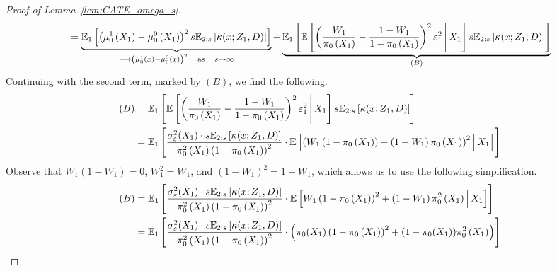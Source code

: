\begin{proof}[Proof of Lemma~\ref{lem:CATE_omega_s}]
\begin{equation}
\begin{aligned}
			 & \quad = \underbrace{\mathbb{E}_{1}\left[\left(\mu_{0}^{1}\left(X_{1}\right) - \mu_{0}^{0}\left(X_{1}\right)\right)^2 s \mathbb{E}_{2:s}\left[\kappa(x; Z_1, D)\right]\right]}_{\longrightarrow \left(\mu_{0}^{1}\left(x\right) - \mu_{0}^{0}\left(x\right)\right)^2 \quad \text{as} \quad s \rightarrow \infty}
			+ \underbrace{\mathbb{E}_{1}\left[\mathbb{E}\left[\left(\frac{W_{1}}{\pi_{0}\left(X_1\right)} - \frac{1 - W_{1}}{1 - \pi_{0}\left(X_1\right)}\right)^2 \varepsilon_{1}^2 \, \middle| \, X_1\right] s \mathbb{E}_{2:s}\left[\kappa(x; Z_1, D)\right]\right]}_{(B)}
		\end{aligned}
	\end{equation}
	Continuing with the second term, marked by $(B)$, we find the following.
	\begin{equation}
		\begin{aligned}
			(B)
			 & = \mathbb{E}_{1}\left[\mathbb{E}\left[\left(\frac{W_{1}}{\pi_{0}\left(X_1\right)} - \frac{1 - W_{1}}{1 - \pi_{0}\left(X_1\right)}\right)^2 \varepsilon_{1}^2 \, \middle| \, X_1\right] s \mathbb{E}_{2:s}\left[\kappa(x; Z_1, D)\right]\right] \\
			 & = \mathbb{E}_{1}\left[\frac{\sigma_{\varepsilon}^2(X_1) \cdot s \mathbb{E}_{2:s}\left[\kappa(x; Z_1, D)\right]}{\pi_{0}^2\left(X_1\right)\left(1 - \pi_{0}\left(X_1\right)\right)^2} \cdot
			\mathbb{E}\left[\left(W_{1}\left(1 - \pi_{0}\left(X_1\right)\right) - \left(1 - W_{1}\right)\pi_{0}\left(X_1\right)\right)^2 \, \middle| \, X_1\right] \right]                                                                    \\
		\end{aligned}
	\end{equation}
	Observe that $W_1(1-W_1) = 0$, $W_1^2 = W_1$, and $(1-W_1)^2 = 1 - W_1$, which allows us to use the following simplification.
	\begin{equation}
		\begin{aligned}
			(B)
			 & = \E_{1}\left[\frac{\sigma_{\varepsilon}^2(X_1) \cdot s \E_{2:s}\left[\kappa(x; Z_1, D)\right]}{\pi_{0}^2\left(X_1\right)\left(1 - \pi_{0}\left(X_1\right)\right)^2} \cdot
			\E\left[W_{1}\left(1 - \pi_{0}\left(X_1\right)\right)^2 + \left(1 - W_{1}\right)\pi_{0}^2\left(X_1\right) \, \middle| \, X_1\right] \right]                                   \\
			 & = \E_{1}\left[\frac{\sigma_{\varepsilon}^2(X_1) \cdot s \E_{2:s}\left[\kappa(x; Z_1, D)\right]}{\pi_{0}^2\left(X_1\right)\left(1 - \pi_{0}\left(X_1\right)\right)^2} \cdot
			\left(\pi_{0}(X_1)\left(1 - \pi_{0}\left(X_1\right)\right)^2 + (1 - \pi_{0}(X_1))\pi_{0}^2\left(X_1\right) \right)\right]                                                             \\

\end{aligned}
\end{equation}
\end{proof}
